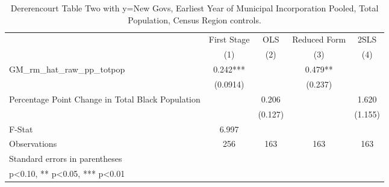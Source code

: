 \begin{table}[htbp]\centering
\def\sym#1{\ifmmode^{#1}\else\(^{#1}\)\fi}
\caption{Dererencourt Table Two with y=New Govs, Earliest Year of Municipal Incorporation  Pooled, Total Population, Census Region controls.}
\begin{tabular}{l*{4}{c}}
\toprule
                    & First Stage   &         OLS   &Reduced Form   &        2SLS   \\
                    &\multicolumn{1}{c}{(1)}   &\multicolumn{1}{c}{(2)}   &\multicolumn{1}{c}{(3)}   &\multicolumn{1}{c}{(4)}   \\
\midrule
GM\_rm\_hat\_raw\_pp\_totpop&       0.242***&               &       0.479** &               \\
                    &    (0.0914)   &               &     (0.237)   &               \\
\addlinespace
Percentage Point Change in Total Black Population&               &       0.206   &               &       1.620   \\
                    &               &     (0.127)   &               &     (1.155)   \\
\midrule
F-Stat              &       6.997   &               &               &               \\
Observations        &         256   &         163   &         163   &         163   \\
\bottomrule
\multicolumn{5}{l}{\footnotesize Standard errors in parentheses}\\
\multicolumn{5}{l}{\footnotesize * p<0.10, ** p<0.05, *** p<0.01}\\
\end{tabular}
\end{table}
